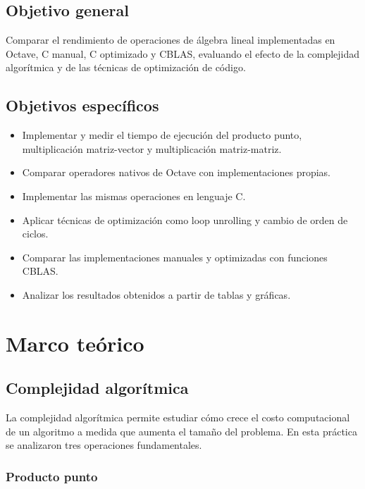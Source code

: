 \documentclass[12pt,letterpaper]{article}
\begin{document}
\subsection{Objetivo general}

Comparar el rendimiento de operaciones de álgebra lineal implementadas en Octave, C manual, C optimizado y CBLAS, evaluando el efecto de la complejidad algorítmica y de las técnicas de optimización de código.

\subsection{Objetivos específicos}

\begin{itemize}
    \item Implementar y medir el tiempo de ejecución del producto punto, multiplicación matriz-vector y multiplicación matriz-matriz.
    \item Comparar operadores nativos de Octave con implementaciones propias.
    \item Implementar las mismas operaciones en lenguaje C.
    \item Aplicar técnicas de optimización como loop unrolling y cambio de orden de ciclos.
    \item Comparar las implementaciones manuales y optimizadas con funciones CBLAS.
    \item Analizar los resultados obtenidos a partir de tablas y gráficas.
\end{itemize}

\section{Marco teórico}

\subsection{Complejidad algorítmica}

La complejidad algorítmica permite estudiar cómo crece el costo computacional de un algoritmo a medida que aumenta el tamaño del problema. En esta práctica se analizaron tres operaciones fundamentales.

\subsubsection{Producto punto}
\end{document}
